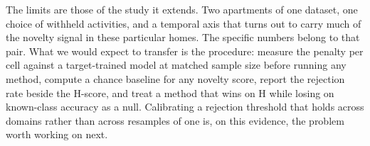The limits are those of the study it extends. Two apartments of one dataset, one choice of
withheld activities, and a temporal axis that turns out to carry much of the novelty
signal in these particular homes. The specific numbers belong to that pair. What we would
expect to transfer is the procedure: measure the penalty per cell against a target-trained
model at matched sample size before running any method, compute a chance baseline for any
novelty score, report the rejection rate beside the H-score, and treat a method that wins
on H while losing on known-class accuracy as a null. Calibrating a rejection threshold
that holds across domains rather than across resamples of one is, on this evidence, the
problem worth working on next.
